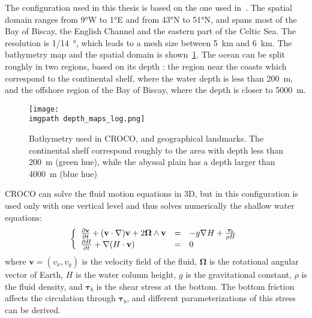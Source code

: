 \documentclass[../../Main_ManuscritThese.tex]{subfiles}
\newcommand{\CROCO}{CROCO}
\newcommand\imgpath{/home/victor/acadwriting/Manuscrit/Text/Chapter5/img/}
\begin{document}
The configuration used in this thesis is based on the one used
in~\cite{boutet_estimation_2015}. The spatial domain ranges from
\ang{9}W to \ang{1}E and from \ang{43}N to \ang{51}N, and spans most
of the Bay of Biscay, the English Channel and the eastern part of the
Celtic Sea.  The resolution is \SI{1/14}{\degree}, which leads to a
mesh size between \SI{5}{\kilo\metre} and \SI{6}{\kilo\metre}. The
bathymetry map and the spatial domain is
shown~\cref{fig:depth_maps}. The ocean can be split roughly in two
regions, based on its depth : the region near the coasts which
correspond to the continental shelf, where the water depth is less
than \SI{200}{\meter}, and the offshore region of the Bay of Biscay,
where the depth is closer to \SI{5000}{\meter}.
\begin{figure}[ht]
  \centering
  \texttt{[image: \\imgpath depth\_maps\_log.png]}
  \caption{\label{fig:depth_maps} Bathymetry used in \CROCO, and
    geographical landmarks. The continental shelf correspond roughly
    to the area with depth less than \SI{200}{\meter} (green hue),
    while the abyssal plain has a depth larger than \SI{4000}{\meter}
    (blue hue)}
\end{figure}


\CROCO{} can solve the fluid motion equations in 3D, but in this
configuration is used only with one vertical level and thus solves
numerically the shallow water equations:
\begin{align}
  \left\{
  \begin{array}{lll}
     \frac{\partial \mathbf{v}}{\partial t} + (\mathbf{v} \cdot \nabla )\mathbf{v} + 2 \bm{\Omega} \wedge \mathbf{v} &=& -g\nabla H + \frac{\bm{\tau}_b}{\rho H} \\
    \frac{\partial H}{\partial t} + \nabla (H \cdot \mathbf{v}) &=& 0
  \end{array}
   \right.
\end{align}
where $\mathbf{v} = (v_x,v_y)$ is the velocity field of the fluid,
$\bm{\Omega}$ is the rotational angular vector of Earth, $H$ is the
water column height, $g$ is the gravitational constant, $\rho$ is the
fluid density, and $\bm{\tau}_b$ is the shear stress at the
bottom. The bottom friction affects the circulation through
$\bm{\tau}_b$, and different parameterizations of this stress can be
derived.
\end{document}
